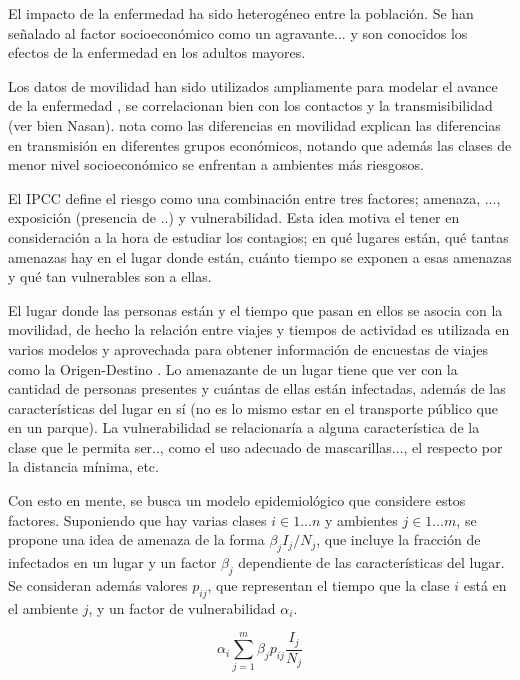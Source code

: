 \begin{intro}
El impacto de la enfermedad ha sido heterogéneo entre la población. Se han señalado al factor socioeconómico \cite{Ahmed2020} como un agravante... y son conocidos los efectos de la enfermedad en los adultos mayores.

Los datos de movilidad han sido utilizados ampliamente para modelar el avance de la enfermedad \cite{Lai2020}\cite{Oliver2020}, se correlacionan bien con los contactos \cite{Prem2020} y la transmisibilidad \cite{Nasan2021} (ver bien Nasan). \cite{Chang2021} nota como las diferencias en movilidad explican las diferencias en transmisión en diferentes grupos económicos, notando que además las clases de menor nivel socioeconómico se enfrentan a ambientes más riesgosos.

El IPCC define el riesgo como una combinación entre tres factores; amenaza, ..., exposición (presencia de ..) y vulnerabilidad. Esta idea motiva el tener en consideración a la hora de estudiar los contagios; en qué lugares están, qué tantas amenazas hay en el lugar donde están, cuánto tiempo se exponen a esas amenazas y qué tan vulnerables son a ellas. 

El lugar donde las personas están y el tiempo que pasan en ellos se asocia con la movilidad, de hecho la relación entre viajes y tiempos de actividad es utilizada en varios modelos \cite{} y aprovechada para obtener información de encuestas de viajes como la Origen-Destino \cite{Munizaga2011}. Lo amenazante de un lugar tiene que ver con la cantidad de personas presentes y cuántas de ellas están infectadas, además de las características del lugar en sí (no es lo mismo estar en el transporte público que en un parque). La vulnerabilidad se relacionaría a alguna característica de la clase que le permita ser.., como el uso adecuado de mascarillas..., el respecto por la distancia mínima, etc.

Con esto en mente, se busca un modelo epidemiológico que considere estos factores. Suponiendo que hay varias clases \(i \in 1 \dots n\) y ambientes \(j \in 1 \dots m\), se propone una idea de amenaza de la forma \(\beta_j I_j/N_j\), que incluye la fracción de infectados en un lugar y un factor \(\beta_j\) dependiente de las características del lugar. Se consideran además valores \(p_{ij}\), que representan el tiempo que la clase \(i\) está en el ambiente \(j\), y un factor de vulnerabilidad \(\alpha_i\).

\begin{equation}
\alpha_i \sum_{j = 1}^m \beta_j p_{ij} \frac{I_j}{N_j}
\end{equation}



\end{intro}
